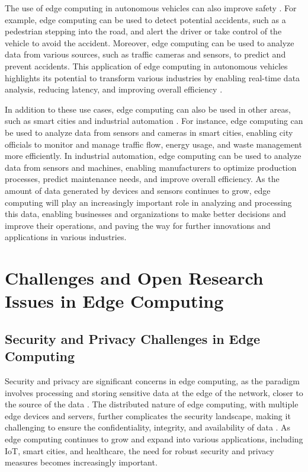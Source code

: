 \documentclass[11pt]{article}
\begin{document}
The use of edge computing in autonomous vehicles can also improve safety \cite{ref49}. For example, edge computing can be used to detect potential accidents, such as a pedestrian stepping into the road, and alert the driver or take control of the vehicle to avoid the accident. Moreover, edge computing can be used to analyze data from various sources, such as traffic cameras and sensors, to predict and prevent accidents. This application of edge computing in autonomous vehicles highlights its potential to transform various industries by enabling real-time data analysis, reducing latency, and improving overall efficiency \cite{ref44}.

In addition to these use cases, edge computing can also be used in other areas, such as smart cities and industrial automation \cite{ref50}. For instance, edge computing can be used to analyze data from sensors and cameras in smart cities, enabling city officials to monitor and manage traffic flow, energy usage, and waste management more efficiently. In industrial automation, edge computing can be used to analyze data from sensors and machines, enabling manufacturers to optimize production processes, predict maintenance needs, and improve overall efficiency. As the amount of data generated by devices and sensors continues to grow, edge computing will play an increasingly important role in analyzing and processing this data, enabling businesses and organizations to make better decisions and improve their operations, and paving the way for further innovations and applications in various industries.

\section{Challenges and Open Research Issues in Edge Computing}

\subsection{Security and Privacy Challenges in Edge Computing}

Security and privacy are significant concerns in edge computing, as the paradigm involves processing and storing sensitive data at the edge of the network, closer to the source of the data \cite{ref3}. The distributed nature of edge computing, with multiple edge devices and servers, further complicates the security landscape, making it challenging to ensure the confidentiality, integrity, and availability of data \cite{ref51}. As edge computing continues to grow and expand into various applications, including IoT, smart cities, and healthcare, the need for robust security and privacy measures becomes increasingly important.
\end{document}
